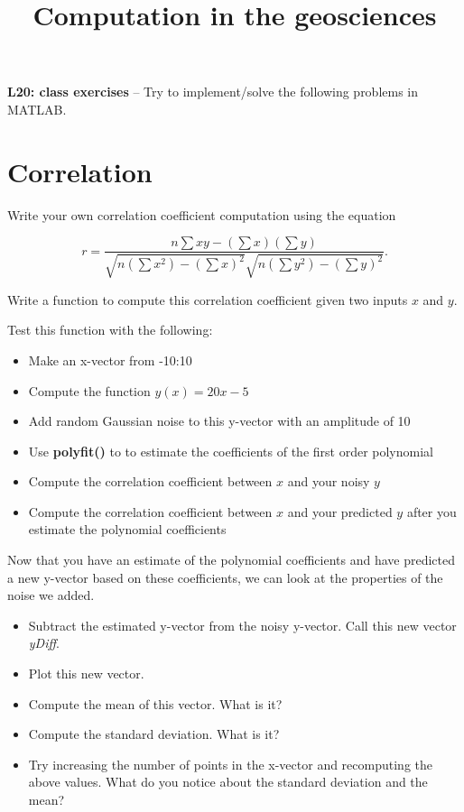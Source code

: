 \documentclass[10pt,fleqn]{article}
\title{Computation in the geosciences}
\date{\empty}
\begin{document}
\textbf{L20: class exercises} -- Try to implement/solve the following problems in MATLAB.

\section*{Correlation}

Write your own correlation coefficient computation using the equation

$$r = \frac{n \sum xy - (\sum x)(\sum y)}{\sqrt{n(\sum x^2)-(\sum x)^2}\sqrt{n(\sum y^2)-(\sum y)^2}}.$$

Write a function to compute this correlation coefficient given two inputs $x$ and $y$.

Test this function with the following:

\begin{itemize}
	\item Make an x-vector from -10:10
	\item Compute the function $y(x) = 20x - 5$
	\item Add random Gaussian noise to this y-vector with an amplitude of 10
	\item Use \textbf{polyfit()} to to estimate the coefficients of the first order polynomial 
	\item Compute the correlation coefficient between $x$ and your noisy $y$
	\item Compute the correlation coefficient between $x$ and your predicted $y$ after you estimate the polynomial coefficients
\end{itemize}

Now that you have an estimate of the polynomial coefficients and have predicted a new y-vector based on these coefficients, we can look at the properties of the noise we added.

\begin{itemize}
	\item Subtract the estimated y-vector from the noisy y-vector. Call this new vector \textit{yDiff}.
	\item Plot this new vector.
	\item Compute the mean of this vector. What is it?
	\item Compute the standard deviation. What is it?
	\item Try increasing the number of points in the x-vector and recomputing the above values. What do you notice about the standard deviation and the mean?
\end{itemize}
\end{document}
